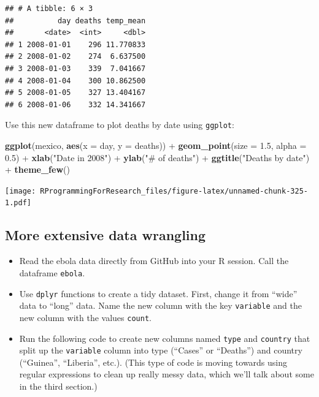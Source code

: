 \documentclass[]{book}
\makeatletter
\newenvironment{Shaded}{\begin{snugshade}}{\end{snugshade}}
\newcommand{\KeywordTok}[1]{\textcolor[rgb]{0.13,0.29,0.53}{\textbf{{#1}}}}
\newcommand{\DataTypeTok}[1]{\textcolor[rgb]{0.13,0.29,0.53}{{#1}}}
\newcommand{\FloatTok}[1]{\textcolor[rgb]{0.00,0.00,0.81}{{#1}}}
\newcommand{\StringTok}[1]{\textcolor[rgb]{0.31,0.60,0.02}{{#1}}}
\newcommand{\NormalTok}[1]{{#1}}
\providecommand{\tightlist}{%
  \setlength{\itemsep}{0pt}\setlength{\parskip}{0pt}}
\newenvironment{kframe}{%
\medskip{}
\setlength{\fboxsep}{.8em}
 \def\at@end@of@kframe{}%
 \ifinner\ifhmode%
  \def\at@end@of@kframe{\end{minipage}}%
  \begin{minipage}{\columnwidth}%
 \fi\fi%
 \def\FrameCommand##1{\hskip\@totalleftmargin \hskip-\fboxsep
 \colorbox{shadecolor}{##1}\hskip-\fboxsep
     \hskip-\linewidth \hskip-\@totalleftmargin \hskip\columnwidth}%
 \MakeFramed {\advance\hsize-\width
   \@totalleftmargin\z@ \linewidth\hsize
   \@setminipage}}%
 {\par\unskip\endMakeFramed%
 \at@end@of@kframe}
\renewenvironment{Shaded}{\begin{kframe}}{\end{kframe}}
\makeatother
\begin{document}
\begin{verbatim}
## # A tibble: 6 × 3
##          day deaths temp_mean
##       <date>  <int>     <dbl>
## 1 2008-01-01    296 11.770833
## 2 2008-01-02    274  6.637500
## 3 2008-01-03    339  7.041667
## 4 2008-01-04    300 10.862500
## 5 2008-01-05    327 13.404167
## 6 2008-01-06    332 14.341667
\end{verbatim}

Use this new dataframe to plot deaths by date using \texttt{ggplot}:

\begin{Shaded}
\begin{Highlighting}[]
\KeywordTok{ggplot}\NormalTok{(mexico, }\KeywordTok{aes}\NormalTok{(}\DataTypeTok{x =} \NormalTok{day, }\DataTypeTok{y =} \NormalTok{deaths)) +}\StringTok{ }
\StringTok{        }\KeywordTok{geom_point}\NormalTok{(}\DataTypeTok{size =} \FloatTok{1.5}\NormalTok{, }\DataTypeTok{alpha =} \FloatTok{0.5}\NormalTok{) +}\StringTok{ }
\StringTok{        }\KeywordTok{xlab}\NormalTok{(}\StringTok{"Date in 2008"}\NormalTok{) +}\StringTok{ }\KeywordTok{ylab}\NormalTok{(}\StringTok{"# of deaths"}\NormalTok{) +}\StringTok{ }
\StringTok{        }\KeywordTok{ggtitle}\NormalTok{(}\StringTok{"Deaths by date"}\NormalTok{) +}\StringTok{ }
\StringTok{        }\KeywordTok{theme_few}\NormalTok{()}
\end{Highlighting}
\end{Shaded}

\texttt{[image: RProgrammingForResearch\_files/figure-latex/unnamed-chunk-325-1.pdf]}

\subsection{More extensive data
wrangling}\label{more-extensive-data-wrangling}

\begin{itemize}
\tightlist
\item
  Read the ebola data directly from GitHub into your R session. Call the
  dataframe \texttt{ebola}.
\item
  Use \texttt{dplyr} functions to create a tidy dataset. First, change
  it from ``wide'' data to ``long'' data. Name the new column with the
  key \texttt{variable} and the new column with the values
  \texttt{count}.
\item
  Run the following code to create new columns named \texttt{type} and
  \texttt{country} that split up the \texttt{variable} column into type
  (``Cases'' or ``Deaths'') and country (``Guinea'', ``Liberia'', etc.).
  (This type of code is moving towards using regular expressions to
  clean up really messy data, which we'll talk about some in the third
  section.)
\end{itemize}
\end{document}
